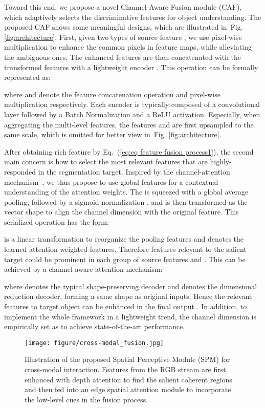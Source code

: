 \documentclass[journal]{IEEEtran}
\newcommand{\figref}[1]{Fig. \ref{#1}}
\newcommand{\equref}[1]{(\ref{#1})}
\begin{document}
Toward this end, we propose a novel Channel-Aware Fusion module (CAF), which adaptively selects the discriminative features for object understanding.
The proposed CAF shows some meaningful designs, which are illustrated in~\figref{fig:architecture}. First, given two types of source feature , we use pixel-wise multiplication to enhance the common pixels in feature maps, while alleviating the ambiguous ones. The enhanced features are then concatenated with the transformed features with a lightweight encoder . This operation can be formally represented as:

where  and  denote the feature concatenation operation and pixel-wise multiplication respectively. Each encoder  is typically composed of a  convolutional layer followed by a Batch Normalization and a ReLU activation.
Especially, when aggregating the multi-level features, the features  and  are first upsampled to the same scale, which is omitted for better view in~\figref{fig:architecture}.

After obtaining rich feature  by Eq.~\equref{eq:eq feature fusion process1}, the second main concern is how to select the most relevant features that are highly-responded in the segmentation target. Inspired by the channel-attention mechanism~\cite{hu2018squeeze,chen2017sca}, we thus propose to use global features for a contextual understanding of the attention weights. The  is squeezed with a global average pooling, followed by a sigmoid normalization , and is then transformed as the vector shape to align the channel dimension with the original feature.
This serialized operation has the form:


 is a linear transformation to reorganize the pooling features and  denotes the learned attention weighted features. Therefore features relevant to the salient target could be prominent in each group of source features  and . This can be achieved by a channel-aware attention mechanism:

where  denotes the typical shape-preserving decoder and  denotes the dimensional reduction decoder, forming a same shape as original inputs. Hence the relevant features to target object can be enhanced in the final output .
In addition, to implement the whole framework in a lightweight trend, the channel dimension  is empirically set as  to achieve state-of-the-art performance.

\begin{figure}[]
\begin{center}
\texttt{[image: figure/cross-modal\_fusion.jpg]}
		\caption{Illustration of the proposed Spatial Perceptive Module (SPM) for cross-modal interaction. Features from the RGB stream are first enhanced with depth attention to find the salient coherent regions and then fed into an edge spatial attention module to incorporate the low-level cues in the fusion process.
		}\label{fig:SPM}
	\end{center}
\end{figure}
\end{document}

